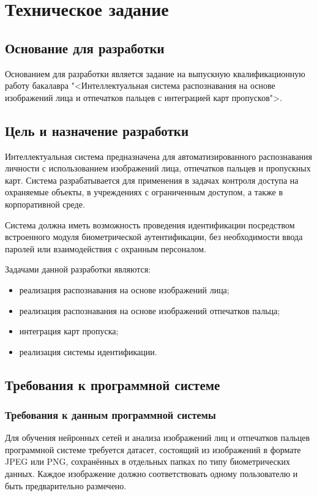 \section{Техническое задание}
\subsection{Основание для разработки}

Основанием для разработки является задание на выпускную квалификационную работу бакалавра "<Интеллектуальная система распознавания на основе изображений лица и отпечатков пальцев с интеграцией карт пропусков">.

\subsection{Цель и назначение разработки}

Интеллектуальная система предназначена для автоматизированного распознавания личности с использованием изображений лица, отпечатков пальцев и пропускных карт. Система разрабатывается для применения в задачах контроля доступа на охраняемые объекты, в учреждениях с ограниченным доступом, а также в корпоративной среде.

Система должна иметь возможность проведения идентификации посредством встроенного модуля биометрической аутентификации, без необходимости ввода паролей или взаимодействия с охранным персоналом.

Задачами данной разработки являются:
\begin{itemize}
\item реализация распознавания на основе изображений лица;
\item реализация распознавания на основе изображений отпечатков пальца;
\item интеграция карт пропуска;
\item реализация системы идентификации.
\end{itemize}

\subsection{Требования к программной системе}

\subsubsection{Требования к данным программной системы}

Для обучения нейронных сетей и анализа изображений лиц и отпечатков пальцев программной системе требуется датасет, состоящий из изображений в формате JPEG или PNG, сохранённых в отдельных папках по типу биометрических данных. Каждое изображение должно соответствовать одному пользователю и быть предварительно размечено.

